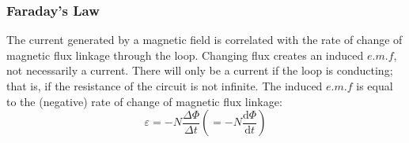 \documentclass[a4paper,12pt]{article}
\begin{document}
\begin{center}
\end{center}
\subsubsection*{Faraday's Law}
The current generated by a magnetic field is correlated with the rate of change of magnetic flux linkage through the loop. Changing flux creates an induced $e.m.f$, not necessarily a current. There will only be a current if the loop is conducting; that is, if the resistance of the circuit is not infinite.
The induced $e.m.f$ is equal to the (negative) rate of change of magnetic flux linkage:
\[\varepsilon=-N\dfrac{\Delta \Phi}{\Delta t}\left(=-N\dfrac{\mathrm{d}\Phi}{\mathrm{d}t}\right)\]
\end{document}
